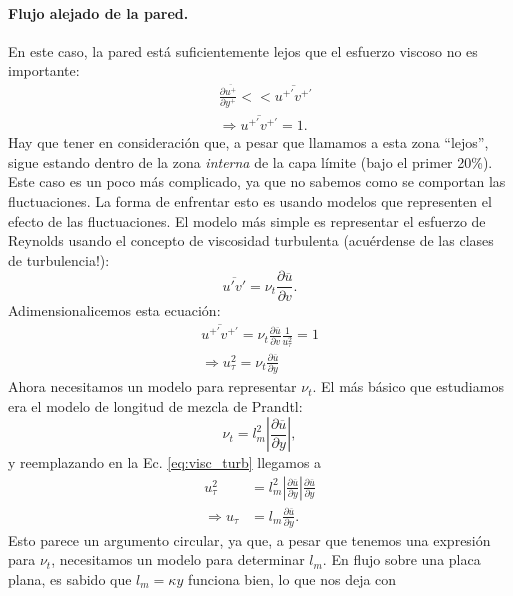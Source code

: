 \paragraph*{Flujo alejado de la pared.} En este caso, la pared está suficientemente lejos que el esfuerzo viscoso no es importante:
%
\begin{align}
&\frac{\partial\overline{u^+}}{\partial y^+} << \overline{u^{+\prime}v^{+\prime}}\nonumber\\
&\Rightarrow \overline{u^{+\prime}v^{+\prime}} = 1.
\end{align}
%
Hay que tener en consideración que, a pesar que llamamos a esta zona ``lejos'', sigue estando dentro de la zona \emph{interna} de la capa límite (bajo el primer 20\%).
Este caso es un poco más complicado, ya que no sabemos como se comportan las fluctuaciones.
La forma de enfrentar esto es usando modelos que representen el efecto de las fluctuaciones.
El modelo más simple es representar el esfuerzo de Reynolds usando el concepto de viscosidad turbulenta (acuérdense de las clases de turbulencia!):
%
\begin{equation}\label{eq:visc_turb}
\overline{u'v'} = \nu_t \frac{\partial\overline{u}}{\partial v}.
\end{equation}
%
Adimensionalicemos esta ecuación:
%
\begin{align}
\overline{u^{+\prime}v^{+\prime}} = \nu_t \frac{\partial\overline{u}}{\partial v}\frac{1}{u_\tau^2} = 1\nonumber\\
\Rightarrow u_\tau^2 = \nu_t \frac{\partial \overline{u}}{\partial y}
\end{align}
%
Ahora necesitamos un modelo para representar $\nu_t$.
El más básico que estudiamos era el modelo de longitud de mezcla de Prandtl:
%
\begin{equation}\label{eq:long_mezcla}
\nu_t = l_m^2\left|\frac{\partial\overline{u}}{\partial y}\right|,
\end{equation}
%
y reemplazando en la Ec. \eqref{eq:visc_turb} llegamos a
%
\begin{align}
u_\tau^2 &= l_m^2\left|\frac{\partial\overline{u}}{\partial y}\right|\frac{\partial\overline{u}}{\partial y} \nonumber\\
\Rightarrow u_\tau &= l_m\frac{\partial\overline{u}}{\partial y}.
\end{align}
%
Esto parece un argumento circular, ya que, a pesar que tenemos una expresión para $\nu_t$, necesitamos un modelo para determinar $l_m$. 
En flujo sobre una placa plana, es sabido que $l_m=\kappa y$ funciona bien, lo que nos deja con
